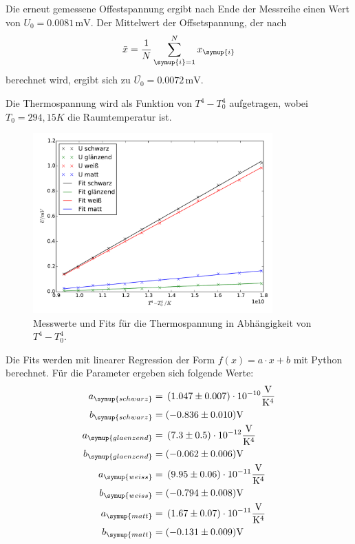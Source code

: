 Die erneut gemessene Offestspannung ergibt nach Ende der Messreihe einen Wert von
$U_0=0.0081 \,\si{\milli\volt}$. Der Mittelwert der Offsetspannung, der nach
\begin{equation}
  \bar{x} = \frac{1}{N} \sum_{\symup{i}=1}^{N} x_\symup{i}
  \label{eqn:mittelwert}
\end{equation}
berechnet wird, ergibt sich zu $\bar{U_0} = 0.0072 \,\si{\milli\volt}$.

Die Thermospannung wird als Funktion von $T^4 - T_0^4$ aufgetragen, wobei $T_0 = 294,15 K$
die Raumtemperatur ist.
\begin{figure}
  \centering
  \includegraphics[width=0.82\textwidth]{thermospannung.pdf}
  \caption{Messwerte und Fits für die Thermospannung in Abhängigkeit von $T^4 - T_0^4$.}
  \label{fig:thermospannung}
\end{figure}
\newline
Die Fits werden mit linearer Regression der Form $f(x) = a \cdot x + b $ mit Python
berechnet.
Für die Parameter ergeben sich folgende Werte:
\begin{align*}
  a_\symup{schwarz}   &= \,(1.047\pm0.007)\cdot10^{-10} \si{\frac{\volt}{\kelvin^4}} \\
  b_\symup{schwarz}   &= (-0.836\pm0.010) \si{\volt} \\
  a_\symup{glaenzend} &= \,(7.3\pm0.5)\cdot10^{-12} \si{\frac{\volt}{\kelvin^4}} \\
  b_\symup{glaenzend} &= (-0.062\pm0.006) \si{\volt} \\
  a_\symup{weiss}     &= \,(9.95\pm0.06)\cdot10^{-11} \si{\frac{\volt}{\kelvin^4}} \\
  b_\symup{weiss}     &= (-0.794\pm0.008) \si{\volt} \\
  a_\symup{matt}      &= \,(1.67\pm0.07)\cdot10^{-11} \si{\frac{\volt}{\kelvin^4}} \\
  b_\symup{matt}      &= (-0.131\pm0.009) \si{\volt}
\end{align*}
